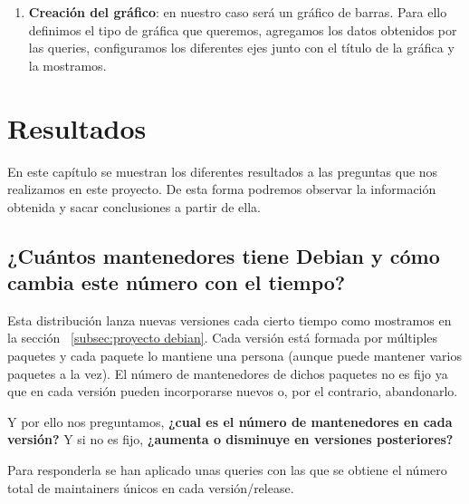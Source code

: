 \documentclass[a4paper, 12pt]{book}
\begin{document}
\begin{enumerate}
	
	\item \textbf{Creación del gráfico}: en nuestro caso será un gráfico de barras. Para ello definimos el tipo de gráfica que queremos, agregamos los datos obtenidos por las queries, configuramos los diferentes ejes junto con el título de la gráfica y la mostramos.
\end{enumerate}



\cleardoublepage
\chapter{Resultados}
\label{chap:resultados}

En este capítulo se muestran los diferentes resultados a las preguntas que nos realizamos en este proyecto. De esta forma podremos observar la información obtenida y sacar conclusiones a partir de ella.

\section{¿Cuántos mantenedores tiene Debian y cómo cambia este número con el tiempo?}
\label{sec:pregunta_1}
Esta distribución lanza nuevas versiones cada cierto tiempo como mostramos en la sección ~\ref{subsec:proyecto debian}. Cada versión está formada por múltiples paquetes y cada paquete lo mantiene una persona (aunque puede mantener varios paquetes a la vez). El número de mantenedores de dichos paquetes no es fijo ya que en cada versión pueden incorporarse nuevos o, por el contrario, abandonarlo.

Y por ello nos preguntamos,  \textbf{¿cual es el número de mantenedores en cada versión?} Y si no es fijo, \textbf{¿aumenta o disminuye en versiones posteriores?}

Para responderla se han aplicado unas queries con las que se obtiene el número total de maintainers únicos en cada versión/release.
\end{document}
